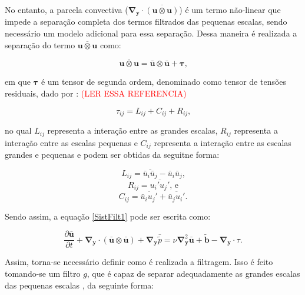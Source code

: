 \documentclass[_ArquivoPrincipal.tex]{subfiles}
\begin{document}
No entanto, a parcela convectiva ($\mathbf{\nabla}_\mathbf{y}\cdot\overline{(\mathbf{u}\otimes\mathbf{u})}$) é um termo não-linear que impede a separação completa dos termos filtrados das pequenas escalas, sendo necessário um modelo adicional para essa separação. Dessa maneira é realizada a separação do termo $\overline{\mathbf{u}\otimes\mathbf{u}}$ como:

\begin{equation}
    \overline{\mathbf{u}\otimes\mathbf{u}}=\bar{\mathbf{u}}\otimes\bar{\mathbf{u}}+\mathbf{\tau}\text{,}
    \label{Sep2}
\end{equation}

\noindent em que $\mathbf{\tau}$ é um tensor de segunda ordem, denominado como tensor de tensões residuais, dado por \cite{leonard1975energy}: \textcolor{red}{(LER ESSA REFERENCIA)}

\begin{equation}
    \tau_{ij}=L_{ij}+C_{ij}+R_{ij}\text{,}
    \label{TensRes}
\end{equation}

\noindent no qual $L_{ij}$ representa a interação entre as grandes escalas, $R_{ij}$ representa a interação entre as escalas pequenas e $C_{ij}$ representa a interação entre as escalas grandes e pequenas e podem ser obtidas da seguitne forma:

\begin{equation}
    L_{ij}=\overline{\bar{u}_i\bar{u}_j}-\bar{u}_i\bar{u}_j\text{,}
    \label{Lij}
\end{equation}
\begin{equation}
    R_{ij}=\overline{u_i'u_j'}\text{, e}
    \label{Cij}
\end{equation}
\begin{equation}
    C_{ij}=\overline{\bar{u}_iu_j'}+\overline{\bar{u}_ju_i'}\text{.}
    \label{Rij}
\end{equation}

Sendo assim, a equação \ref{SistFilt1} pode ser escrita como:

\begin{equation}
    \frac{\partial\bar{\mathbf{u}}}{\partial t}+\mathbf{\nabla}_\mathbf{y}\cdot{(\bar{\mathbf{u}}\otimes\bar{\mathbf{u}})}+\mathbf{\nabla}_\mathbf{y}\bar{\tilde{p}}=\nu\mathbf{\nabla}^2_\mathbf{y}\bar{\mathbf{u}}+\tilde{\mathbf{b}}-\mathbf{\nabla}_\mathbf{y}\cdot\tau\text{.}
    \label{EqFiltrada}
\end{equation}

Assim, torna-se necessário definir como é realizada a filtragem. Isso é feito tomando-se um filtro $g$, que é capaz de separar adequadamente as grandes escalas das pequenas escalas \cite{hughes2000large}, da seguinte forma:
\end{document}
